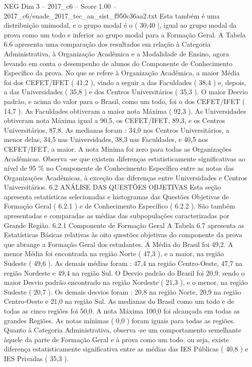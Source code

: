 \begin{textsample}{NEG Dim 3 – 2017\_c6 – Score 1.00 – 2017\_c6/enade\_2017\_tec\_an\_sist\_f950c36aa2.txt}
Esta também é uma distribuição unimodal, e o grupo modal é o ( 30,40 ], igual ao grupo modal da prova como um todo e inferior ao grupo modal para a Formação Geral.
A Tabela 6.6 apresenta uma comparação dos resultados em relação à Categoria Administrativa, à Organização Acadêmica e a Modalidade de Ensino, agora levando em conta o desempenho de alunos do Componente de Conhecimento Específico da prova.
No que se refere à Organização Acadêmica, a maior Média foi dos CEFET/IFET ( 41,2 ), vindo a seguir a das Faculdades ( 38,4 ) e, depois, a das Universidades ( 35,8 ) e dos Centros Universitários ( 35,3 ).
O maior Desvio padrão, e acima do valor para o Brasil, como um todo, foi o dos CEFET/IFET ( 14,7 ).
As Faculdades obtiveram a maior nota Máxima ( 92,3 ).
As Universidades obtiveram nota Máxima igual a 90,5, os CEFET/IFET, 89,3, e os Centros Universitários, 87,8.
As medianas foram : 34,0 nos Centros Universitários, a menor delas, 34,5 nas Universidades, 38,3 nas Faculdades, e 40,5 nos CEFET/IFET, a maior.
A nota Mínima foi zero para todas as Organizações Acadêmicas.
Observa -se que existem diferenças estatisticamente significativas ao nível de 95 \% no Componente de Conhecimento Específico entre as notas das Organizações Acadêmicas, à exceção das diferenças entre Universidades e Centros Universitários. 6.2 ANÁLISE DAS QUESTÕES OBJETIVAS Esta seção apresenta estatísticas selecionadas e histogramas das Questões Objetivas de Formação Geral ( 6.2.1 ) e de Conhecimento Específico ( 6.2.2 ).
São também apresentadas e comparadas as médias das subpopulações caracterizadas por Grande Região. 6.2.1 Componente de Formação Geral A Tabela 6.7 apresenta as Estatísticas Básicas relativas às oito questões objetivas do componente da prova que abrange a Formação Geral dos estudantes.
A Média do Brasil foi 49,2.
A menor Média foi encontrada na região Norte ( 47,3 ), e a maior, na região Sudeste ( 49,6 ).
As demais médias foram : 47,4 na região Centro-Oeste, 47,7 na região Nordeste e 49,4 na região Sul.
O Desvio padrão do Brasil foi 20,9, sendo o maior Desvio padrão encontrado na região Nordeste ( 21,3 ), e o menor, na região Sudeste ( 20,7 ).
Os demais desvios foram : 20,8 na região Norte, 20,9 na região Centro-Oeste e 21,0 na região Sul.
As medianas do Brasil como um todo e de todas as cinco regiões foi 50,0.
A nota Máxima 100,0 foi alcançada em todas as grandes Regiões.
As notas mínimas ( 0,0 ) foram iguais para todas as regiões.
Quanto à Categoria Administrativa, observa -se um comportamento semelhante àquele da parte de Formação Geral e à prova como um todo, ou seja, existe diferença estatisticamente significativa entre as médias das IES Públicas ( 40,8 ) e IES Privadas ( 35,3 ).

\end{textsample}
